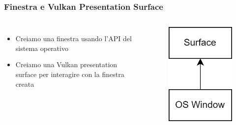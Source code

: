 \begin{frame}
\frametitle{Finestra e Vulkan Presentation Surface}
\begin{columns}


\begin{itemize}
\item Creiamo una finestra usando l'API del sistema operativo
\item Creiamo una Vulkan presentation surface per interagire con la finestra creata
\end{itemize}


\begin{figure}[ht]
    \centering
    \includegraphics[scale=0.2]{images/SlidesInitializingVulkan/WindowAndSurface.png}
\end{figure}

\end{columns}
\end{frame}

